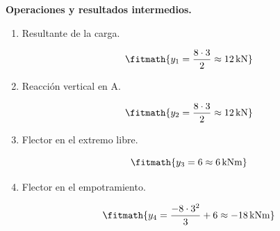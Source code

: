 \noindent\textbf{Operaciones y resultados intermedios.}

\begin{enumerate}

\item Resultante de la carga.

\[\fitmath{y_{1}=\frac{8\cdot 3}{2}\approx 12\,\mathrm{kN}}\]

\item Reacción vertical en A.

\[\fitmath{y_{2}=\frac{8\cdot 3}{2}\approx 12\,\mathrm{kN}}\]

\item Flector en el extremo libre.

\[\fitmath{y_{3}=6\approx 6\,\mathrm{kN m}}\]

\item Flector en el empotramiento.

\[\fitmath{y_{4}=\frac{-8\cdot {3}^{2}}{3}+6\approx -18\,\mathrm{kN m}}\]

\end{enumerate}
